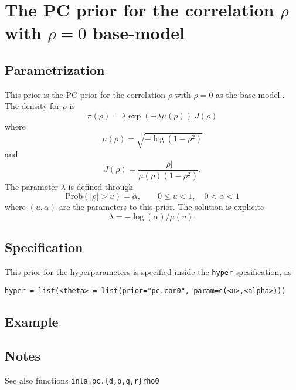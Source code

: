 \documentclass[a4paper,11pt]{article}
\begin{document}
\section*{The PC prior for the correlation $\rho$ with $\rho=0$ base-model}

\subsection*{Parametrization}
This prior is the PC prior for the correlation $\rho$ with $\rho=0$ as
the base-model.. The density for $\rho$ is
\begin{displaymath}
    \pi(\rho) = \lambda \exp(-\lambda \mu(\rho)) \; J(\rho)
\end{displaymath}
where
\begin{displaymath}
    \mu(\rho) = \sqrt{-\log(1-\rho^{2})}
\end{displaymath}
and
\begin{displaymath}
    J(\rho) = \frac{|\rho|}{\mu(\rho) (1-\rho^{2})}.
\end{displaymath}
The parameter $\lambda$ is defined through
\begin{displaymath}
    \text{Prob}( |\rho| > u) = \alpha, \qquad 0 \le u < 1, \quad 0<\alpha<1
\end{displaymath}
where $(u, \alpha{})$ are the parameters to this prior. The solution
is explicite 
\begin{displaymath}
    \lambda = -\log(\alpha)/\mu(u).
\end{displaymath}

\subsection*{Specification}
This prior for the hyperparameters is specified inside the
\texttt{hyper}-spesification, as
\begin{center}
    \texttt{hyper = list(<theta> = list(prior="pc.cor0", param=c(<u>,<alpha>)))}
\end{center}

\subsection*{Example}

\subsection*{Notes}
See also functions \texttt{inla.pc.\{d,p,q,r\}rho0}
\end{document}
